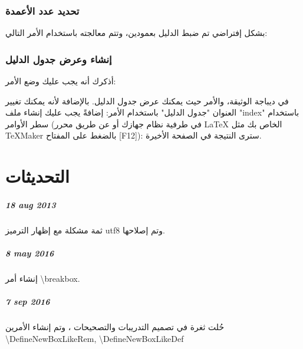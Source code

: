 \documentclass[12pt,a4paper]{mathbook_arabic}
\newcommand\ee{\textenglish}
\begin{document}
 \subsection{تحديد عدد الأعمدة}
 بشكل إفتراضي تم ضبط الدليل بعمودين،  
وتتم معالجته باستخدام الأمر التالي:  
  
  
  \subsection{إنشاء وعرض جدول الدليل }
  أذكرك أنه يجب عليك وضع الأمر:
  
     \LR{\begin{lstlisting}
\makeindex
\end{lstlisting}}
  في ديباجة الوثيقة، والأمر
       \LR{\begin{lstlisting}
\printindex
\end{lstlisting}}
  حيث يمكنك عرض جدول الدليل. بالإضافة لأنه يمكنك تغيير العنوان "جدول الدليل" باستخدام الأمر:
         \LR{\begin{lstlisting}
\renewcommand{\indexname}{<name personalty>}
\end{lstlisting}}
  إضافةً يجب عليك إنشاء ملف 
  \ee{"index"}
  باستخدام سطر الأوامر (في طرفية نظام جهازك أو عن طريق محرر 
  \LaTeX
  الخاص بك مثل
  \ee{\TeX Maker}
  بالضغط على المفتاح
  [F12]):
 سترى النتيجة في الصفحة الأخيرة.
  
  \chapter{التحديثات}
  
  
 
  
 
  
 \paragraph{\ee{18 aug 2013}}
  \qquad
  ثمة مشكلة مع إظهار الترميز utf8 
   وتم إصلاحها.
 
\paragraph{\ee{8 may 2016}}
  \qquad
     إنشاء أمر 
   \ee{\textbackslash breakbox}.
 
\paragraph{\ee{7 sep 2016}}
  \qquad
   حُلت ثغرة في تصميم التدريبات والتصحيحات ، وتم إنشاء الأمرين 
 \\\ee{\textbackslash DefineNewBoxLikeRem,
 \textbackslash DefineNewBoxLikeDef} 
 
 \backmatter
  \def\nbcolindex{1}
\printindex
  
  
  
 
  
  
  	 
 
 
 
\end{document}
